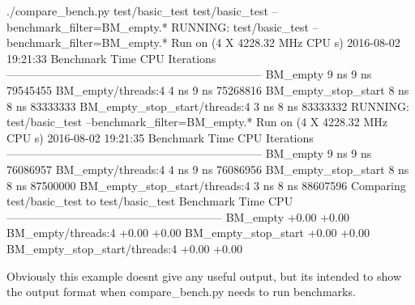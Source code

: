 \begin{DoxyCode}
./compare\_bench.py  test/basic\_test test/basic\_test  --benchmark\_filter=BM\_empty.*
RUNNING: test/basic\_test --benchmark\_filter=BM\_empty.*
Run on (4 X 4228.32 MHz CPU s)
2016-08-02 19:21:33
Benchmark                              Time           CPU Iterations
--------------------------------------------------------------------
BM\_empty                               9 ns          9 ns   79545455
BM\_empty/threads:4                     4 ns          9 ns   75268816
BM\_empty\_stop\_start                    8 ns          8 ns   83333333
BM\_empty\_stop\_start/threads:4          3 ns          8 ns   83333332
RUNNING: test/basic\_test --benchmark\_filter=BM\_empty.*
Run on (4 X 4228.32 MHz CPU s)
2016-08-02 19:21:35
Benchmark                              Time           CPU Iterations
--------------------------------------------------------------------
BM\_empty                               9 ns          9 ns   76086957
BM\_empty/threads:4                     4 ns          9 ns   76086956
BM\_empty\_stop\_start                    8 ns          8 ns   87500000
BM\_empty\_stop\_start/threads:4          3 ns          8 ns   88607596
Comparing test/basic\_test to test/basic\_test
Benchmark                              Time           CPU
---------------------------------------------------------
BM\_empty                              +0.00         +0.00
BM\_empty/threads:4                    +0.00         +0.00
BM\_empty\_stop\_start                   +0.00         +0.00
BM\_empty\_stop\_start/threads:4         +0.00         +0.00
\end{DoxyCode}


Obviously this example doesn\textquotesingle{}t give any useful output, but it\textquotesingle{}s intended to show the output format when \textquotesingle{}compare\+\_\+bench.\+py\textquotesingle{} needs to run benchmarks. 